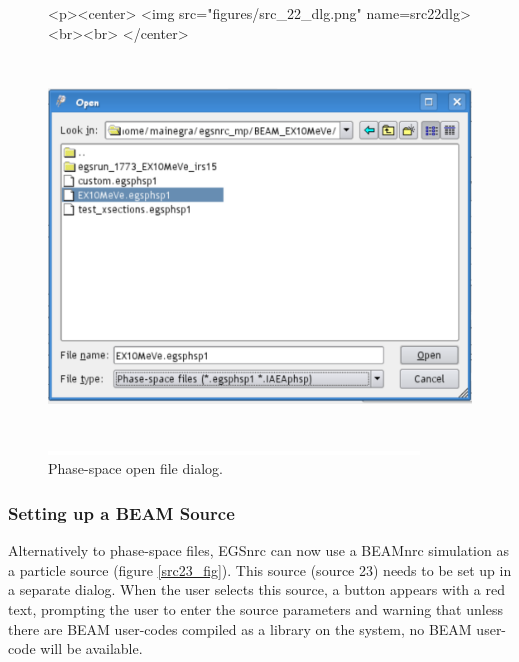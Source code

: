 \documentclass[12pt,twoside]{article}   %
\begin{document}
\begin{figure}[htb]
\begin{htmlonly}
\begin{rawhtml}
<p><center>
<img src="figures/src_22_dlg.png" name=src22dlg><br><br>
</center>
\end{rawhtml}
\end{htmlonly}
\begin{latexonly}
\begin{center}
\includegraphics[height=10cm]{figures/src_22_dlg}
\end{center}
\end{latexonly}
\begin{center}
\includegraphics[height=1mm]{figures/fake2}
\end{center}
\caption{Phase-space open file dialog.}
\label{src22_dlg}
\end{figure}

\subsubsection{Setting up a BEAM Source}

Alternatively to phase-space files, EGSnrc can now use a
BEAMnrc simulation as a particle source (figure \ref{src23_fig}).
This source
(source 23) needs to be set up in a separate dialog. When
the user selects this source, a button appears with a red
text, prompting the user to enter the source parameters and
warning that unless there are BEAM user-codes compiled as
a library on the system, no BEAM user-code will be available.
\vspace*{5mm}
\end{document}
